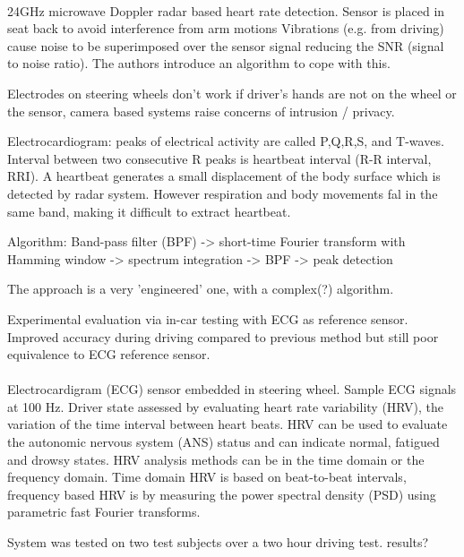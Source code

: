 \documentclass[11pt, parskip=half*,twoside=false]{scrbook}
\begin{document}
\paragraph{\citep{tsuchiyaHeartbeatDetectionTechnology2020}} 24GHz microwave Doppler radar based heart rate detection. Sensor is placed in seat back to avoid interference from arm motions  Vibrations (e.g. from driving) cause noise to be superimposed over the sensor signal reducing the SNR (signal to noise ratio). The authors introduce an algorithm to cope with this. 

Electrodes on steering wheels don't work if driver's hands are not on the wheel or the sensor, camera based systems raise concerns of intrusion / privacy. 

Electrocardiogram: peaks of electrical activity are called P,Q,R,S, and T-waves. Interval between two consecutive R peaks is heartbeat interval (R-R interval, RRI). A heartbeat generates a small displacement of the body surface which is detected by radar system. However  respiration and body movements fal in the same band, making it difficult to extract heartbeat.

Algorithm: Band-pass filter (BPF) -> short-time Fourier transform with Hamming window -> spectrum integration -> BPF -> peak detection

The approach is a very 'engineered' one, with a complex(?) algorithm. 

Experimental evaluation via in-car testing with ECG as reference sensor. Improved accuracy during driving compared to previous method but still poor equivalence to ECG reference sensor.

\paragraph{\citep{jungDriverFatigueDrowsiness2014}} Electrocardigram (ECG) sensor embedded in steering wheel. Sample ECG signals at 100 Hz. Driver state assessed by evaluating heart rate variability (HRV), the variation of the time interval between heart beats. HRV can be used to evaluate the autonomic nervous system (ANS) status and can indicate normal, fatigued and drowsy states. HRV analysis methods can be in the time domain or the frequency domain. Time domain HRV is based on beat-to-beat intervals, frequency based HRV is by measuring the power spectral density (PSD) using parametric fast Fourier transforms.

System was tested on two test subjects over a two hour driving test. results?
\end{document}
